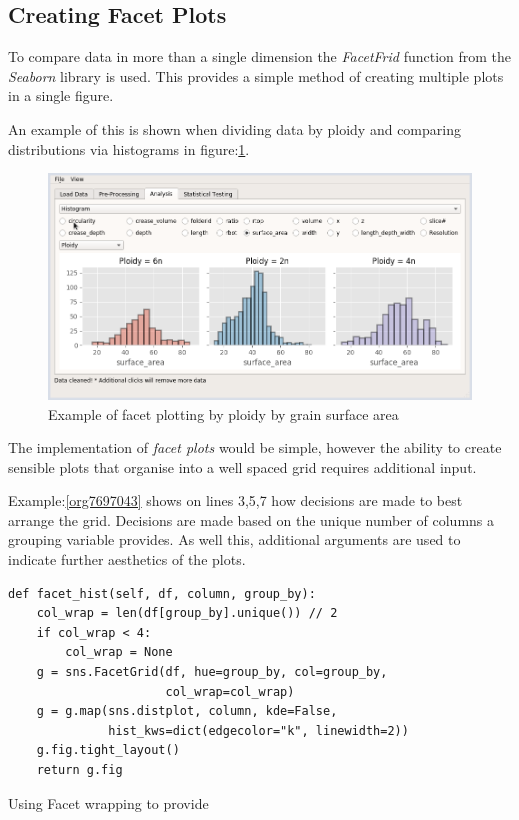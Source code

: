 \documentclass[11pt]{report}
\begin{document}
\clearpage
\subsection{Creating Facet Plots}
\label{sec:org0f41687}

To compare data in more than a single dimension the \emph{FacetFrid} function from the \emph{Seaborn} library is used. This provides a simple method of creating multiple plots in a single figure.

An example of this is shown when dividing data by ploidy and comparing distributions via histograms in figure:\ref{fig:org130c542}.

\begin{figure}[htbp]
\centering
\includegraphics[width=12cm]{./images/facet_example.png}
\caption{\label{fig:org130c542}
Example of facet plotting by ploidy by grain surface area}
\end{figure}

The implementation of \emph{facet plots} would be simple, however the ability to create sensible plots that organise into a well spaced grid requires additional input.

Example:\ref{org7697043} shows on lines 3,5,7 how decisions are made to best arrange the grid. Decisions are made based on the unique number of columns a grouping variable provides. As well this,  additional arguments are  used to indicate further aesthetics of the plots.

\begin{listing}[htbp]
\begin{verbatim}
def facet_hist(self, df, column, group_by):
    col_wrap = len(df[group_by].unique()) // 2
    if col_wrap < 4:
        col_wrap = None
    g = sns.FacetGrid(df, hue=group_by, col=group_by,
                      col_wrap=col_wrap)
    g = g.map(sns.distplot, column, kde=False,
              hist_kws=dict(edgecolor="k", linewidth=2))
    g.fig.tight_layout()
    return g.fig
\end{verbatim}
\caption{\label{org7697043}
Using Facet wrapping to provide}
\end{listing}
\end{document}
